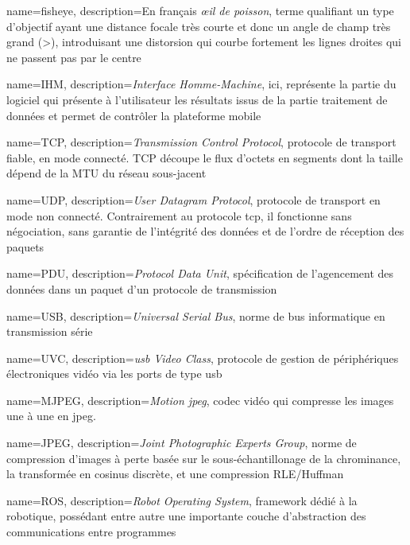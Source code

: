 \makeglossaries

{
	name={fisheye},
	description={En français \emph{\oe{}il de poisson}, terme qualifiant un type d'objectif ayant une distance focale très courte et donc un angle de champ très grand (>\degre), introduisant une distorsion qui courbe fortement les lignes droites qui ne passent pas par le centre}
}

{
	name={IHM},
	description={\emph{Interface Homme-Machine}, ici, représente la partie du logiciel qui présente à l'utilisateur les résultats issus de la partie traitement de données et permet de contrôler la plateforme mobile}
}

{
	name={TCP},
	description={\emph{Transmission Control Protocol}, protocole de transport fiable, en mode connecté. TCP découpe le flux d’octets en segments dont la taille dépend de la MTU du réseau sous-jacent}
}

{
	name={UDP},
	description={\emph{User Datagram Protocol}, protocole de transport en mode non connecté. Contrairement au protocole \gls{tcp}, il fonctionne sans négociation, sans garantie de l'intégrité des données et de l'ordre de réception des paquets}
}

{
	name={PDU},
	description={\emph{Protocol Data Unit}, spécification de l'agencement des données dans un paquet d'un protocole de transmission}
}

{
	name={USB},
	description={\emph{Universal Serial Bus}, norme de bus informatique en transmission série}
}

{
	name={UVC},
	description={\emph{\gls{usb} Video Class}, protocole de gestion de périphériques électroniques vidéo via les ports de type \gls{usb}}
}

{
	name={MJPEG},
	description={\emph{Motion \gls{jpeg}}, codec vidéo qui compresse les images une à une en \gls{jpeg}.}
}

{
	name={JPEG},
	description={\emph{Joint Photographic Experts Group}, norme de compression d'images à perte basée sur le sous-échantillonage de la chrominance, la transformée en cosinus discrète, et une compression RLE/Huffman}
}

{
	name={ROS},
	description={\emph{Robot Operating System}, framework dédié à la robotique, possédant entre autre une importante couche d'abstraction des communications entre programmes}
}

